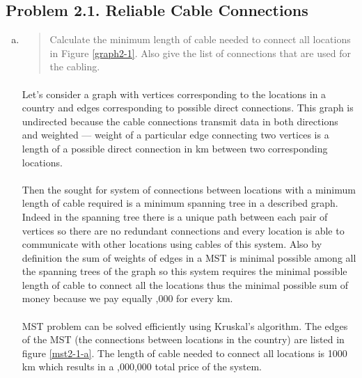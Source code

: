\subsection{Problem 2.1. Reliable Cable Connections}
\begin{enumerate}[(a)]
\item \begin{quote}Calculate the minimum length of cable needed to connect all locations in Figure
\ref{graph2-1}. Also give the list of connections that are used for the cabling.\end{quote}

	\paragraph{}
	Let's consider a graph with vertices corresponding to the locations in a country and edges corresponding to possible direct connections. This graph is undirected because the cable connections transmit data in both directions and weighted --- weight of a particular edge connecting two vertices is a length of a possible direct connection in km between two corresponding locations.

	\paragraph{}
	Then the sought for system of connections between locations with a minimum length of cable required is a minimum spanning tree in a described graph. Indeed in the spanning tree there is a unique path between each pair of vertices so there are no redundant connections and every location is able to communicate with other locations using cables of this system. Also by definition the sum of weights of edges in a MST is minimal possible among all the spanning trees of the graph so this system requires the minimal possible length of cable to connect all the locations thus the minimal possible sum of money because we pay equally ,000 for every km.

	\paragraph{}
	MST problem can be solved efficiently using Kruskal's algorithm. The edges of the MST (the connections between locations in the country) are listed in figure \ref{mst2-1-a}. The length of cable needed to connect all locations is 1000 km which results in a ,000,000 total price of the system.


\end{enumerate}
